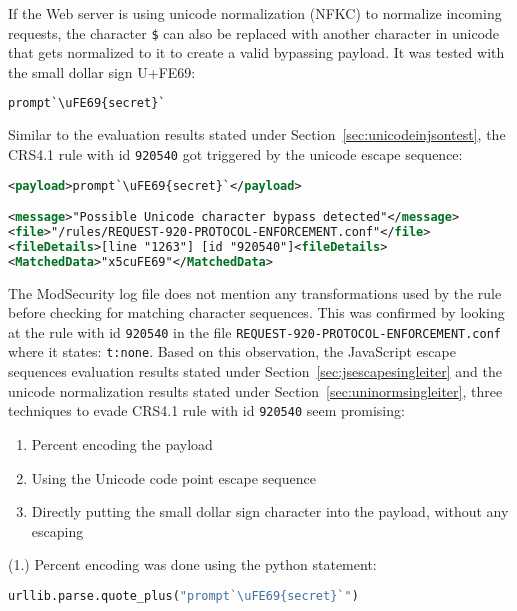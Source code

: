 If the Web server is using unicode normalization (NFKC) to normalize incoming requests, the character \verb|$| can also be replaced with another character in unicode that gets normalized to it to create a valid bypassing payload. It was tested with the small dollar sign U+FE69: 

\begin{lstlisting}[style=basicStyle, language=Python]
prompt`\uFE69{secret}`
\end{lstlisting}

Similar to the evaluation results stated under Section~\ref{sec:unicodeinjsontest}, the CRS4.1 rule with id \verb|920540| got triggered by the unicode escape sequence:

\begin{lstlisting}[style=ruleStyle, language=XML]
<payload>prompt`\uFE69{secret}`</payload>

<message>"Possible Unicode character bypass detected"</message>
<file>"/rules/REQUEST-920-PROTOCOL-ENFORCEMENT.conf"</file>
<fileDetails>[line "1263"] [id "920540"]<fileDetails>
<MatchedData>"x5cuFE69"</MatchedData>
\end{lstlisting}

The ModSecurity log file does not mention any transformations used by the rule before checking for matching character sequences. This was confirmed by looking at the rule with id \verb|920540| in the file \verb|REQUEST-920-PROTOCOL-ENFORCEMENT.conf| where it states: \verb|t:none|. Based on this observation, the JavaScript escape sequences evaluation results stated under Section~\ref{sec:jsescapesingleiter} and the unicode normalization results stated under Section~\ref{sec:uninormsingleiter}, three techniques to evade CRS4.1 rule with id \verb|920540| seem promising:

\begin{enumerate}
	\item Percent encoding the payload
	\item Using the Unicode code point escape sequence
	\item Directly putting the small dollar sign character into the payload, without any escaping
\end{enumerate}

(1.) Percent encoding was done using the python statement:

\begin{lstlisting}[style=basicStyle, language=Python]
urllib.parse.quote_plus("prompt`\uFE69{secret}`")
\end{lstlisting}

